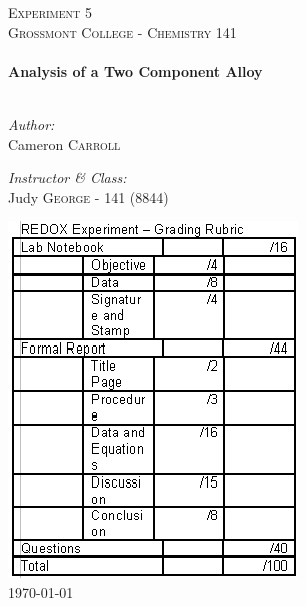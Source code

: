 \begin{titlepage}
\begin{center}

\textsc{\Large Experiment 5}\\[1.5cm]
\textsc{\Large Grossmont College - Chemistry 141}\\[0.5cm]

\HRule \\[0.4cm]
{ \LARGE \bfseries Analysis of a Two Component Alloy}\\[0.5cm]

\HRule \\[1.5cm]

\begin{minipage}{0.4\textwidth}
\begin{flushleft} \large
\emph{Author:}\\
Cameron \textsc{Carroll}
\end{flushleft}
\end{minipage}
\begin{minipage}{0.4\textwidth}
\begin{flushright} \large
\emph{Instructor \& Class:}\\
Judy \textsc{George} - 141 (8844)
\end{flushright}
\end{minipage}

\vfill

\includegraphics{./redox_rxn_rubric.png}\\[1cm]

{\large \today}

\end{center}
\end{titlepage}